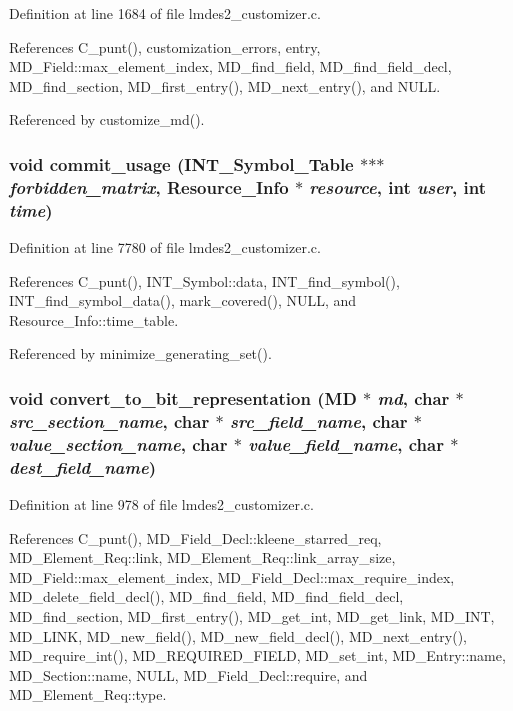 Definition at line 1684 of file lmdes2\_\-customizer.c.

References C\_\-punt(), customization\_\-errors, entry, MD\_\-Field::max\_\-element\_\-index, MD\_\-find\_\-field, MD\_\-find\_\-field\_\-decl, MD\_\-find\_\-section, MD\_\-first\_\-entry(), MD\_\-next\_\-entry(), and NULL.

Referenced by customize\_\-md().
\subsubsection{\setlength{\rightskip}{0pt plus 5cm}void commit\_\-usage (\bf{INT\_\-Symbol\_\-Table} $\ast$$\ast$$\ast$ {\em forbidden\_\-matrix}, \bf{Resource\_\-Info} $\ast$ {\em resource}, int {\em user}, int {\em time})}\label{lmdes2__customizer_8c_7bbd7a4ef676ca025d871cea39549a0d}




Definition at line 7780 of file lmdes2\_\-customizer.c.

References C\_\-punt(), INT\_\-Symbol::data, INT\_\-find\_\-symbol(), INT\_\-find\_\-symbol\_\-data(), mark\_\-covered(), NULL, and Resource\_\-Info::time\_\-table.

Referenced by minimize\_\-generating\_\-set().
\subsubsection{\setlength{\rightskip}{0pt plus 5cm}void convert\_\-to\_\-bit\_\-representation (\bf{MD} $\ast$ {\em md}, char $\ast$ {\em src\_\-section\_\-name}, char $\ast$ {\em src\_\-field\_\-name}, char $\ast$ {\em value\_\-section\_\-name}, char $\ast$ {\em value\_\-field\_\-name}, char $\ast$ {\em dest\_\-field\_\-name})}\label{lmdes2__customizer_8c_8d183a09983eb17f4c21eba43c6ac1cc}




Definition at line 978 of file lmdes2\_\-customizer.c.

References C\_\-punt(), MD\_\-Field\_\-Decl::kleene\_\-starred\_\-req, MD\_\-Element\_\-Req::link, MD\_\-Element\_\-Req::link\_\-array\_\-size, MD\_\-Field::max\_\-element\_\-index, MD\_\-Field\_\-Decl::max\_\-require\_\-index, MD\_\-delete\_\-field\_\-decl(), MD\_\-find\_\-field, MD\_\-find\_\-field\_\-decl, MD\_\-find\_\-section, MD\_\-first\_\-entry(), MD\_\-get\_\-int, MD\_\-get\_\-link, MD\_\-INT, MD\_\-LINK, MD\_\-new\_\-field(), MD\_\-new\_\-field\_\-decl(), MD\_\-next\_\-entry(), MD\_\-require\_\-int(), MD\_\-REQUIRED\_\-FIELD, MD\_\-set\_\-int, MD\_\-Entry::name, MD\_\-Section::name, NULL, MD\_\-Field\_\-Decl::require, and MD\_\-Element\_\-Req::type.


